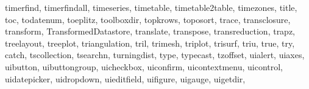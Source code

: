 {{        timerfind,%
        timerfindall,%
        timeseries,%
        timetable,%
        timetable2table,%
        timezones,%
        title,%
        toc,%
        todatenum,%
        toeplitz,%
        toolboxdir,%
        topkrows,%
        toposort,%
        trace,%
        transclosure,%
        transform,%
        TransformedDatastore,%
        translate,%
        transpose,%
        transreduction,%
        trapz,%
        treelayout,%
        treeplot,%
        triangulation,%
        tril,%
        trimesh,%
        triplot,%
        trisurf,%
        triu,%
        true,%
        try, catch,%
        tscollection,%
        tsearchn,%
        turningdist,%
        type,%
        typecast,%
        tzoffset,%
        uialert,%
        uiaxes,%
        uibutton,%
        uibuttongroup,%
        uicheckbox,%
        uiconfirm,%
        uicontextmenu,%
        uicontrol,%
        uidatepicker,%
        uidropdown,%
        uieditfield,%
        uifigure,%
        uigauge,%
        uigetdir,%
}}
